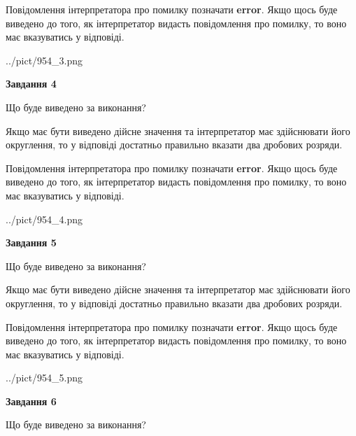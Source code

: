 \documentclass[12pt, ukrainian]{article}
\begin{document}
{\begin {Large}
Повідомлення інтерпретатора про помилку позначати \textbf{error}.
Якщо щось буде виведено до того, як інтерпретатор видасть повідомлення про помилку, 
то воно має вказуватись у відповіді. \par

\begin{center}
	{../pict/954_3.png}
\end{center}
\newpage

{\begin {center}\textbf{Завдання 4}\end {center}}\par
Що буде виведено за виконання? \par

Якщо має бути виведено дійсне значення та інтерпретатор має здійснювати його округлення, 
то у відповіді достатньо правильно вказати два дробових розряди.

Повідомлення інтерпретатора про помилку позначати \textbf{error}.
Якщо щось буде виведено до того, як інтерпретатор видасть повідомлення про помилку, 
то воно має вказуватись у відповіді. \par

\begin{center}
	{../pict/954_4.png}
\end{center}
\newpage

{\begin {center}\textbf{Завдання 5}\end {center}}\par
Що буде виведено за виконання? \par

Якщо має бути виведено дійсне значення та інтерпретатор має здійснювати його округлення, 
то у відповіді достатньо правильно вказати два дробових розряди.

Повідомлення інтерпретатора про помилку позначати \textbf{error}.
Якщо щось буде виведено до того, як інтерпретатор видасть повідомлення про помилку, 
то воно має вказуватись у відповіді. \par

\begin{center}
	{../pict/954_5.png}
\end{center}
\newpage

{\begin {center}\textbf{Завдання 6}\end {center}}\par
Що буде виведено за виконання? \par


\end{Large}}
\end{document}
